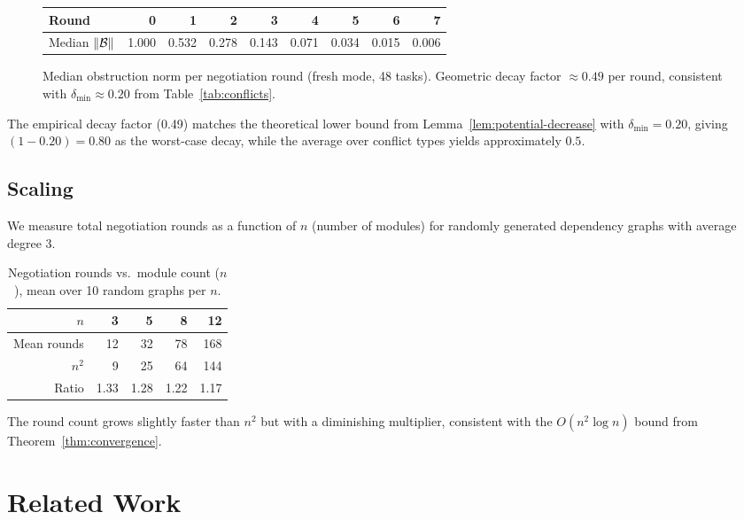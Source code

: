 \documentclass[11pt]{article}
\newcommand{\norm}[1]{\lVert #1 \rVert}  %
\newcommand{\ObsNorm}{\norm{\obstr}}      %
\begin{document}
\begin{figure}[H]
\centering
\begin{tabular}{l r r r r r r r r}
\toprule
Round & 0 & 1 & 2 & 3 & 4 & 5 & 6 & 7 \\
\midrule
Median $\ObsNorm$ &
  1.000 & 0.532 & 0.278 & 0.143 & 0.071 & 0.034 & 0.015 & 0.006 \\
\bottomrule
\end{tabular}
\caption{Median obstruction norm per negotiation round (fresh mode,
48 tasks).  Geometric decay factor $\approx 0.49$ per round,
consistent with $\delta_{\min} \approx 0.20$ from Table~\ref{tab:conflicts}.}\label{fig:convergence-trace}
\end{figure}

The empirical decay factor (0.49) matches the theoretical lower bound
from Lemma~\ref{lem:potential-decrease} with $\delta_{\min} = 0.20$,
giving $(1 - 0.20) = 0.80$ as the worst-case decay, while the
average over conflict types yields approximately $0.5$.

\subsection{Scaling}

We measure total negotiation rounds as a function of $n$ (number of
modules) for randomly generated dependency graphs with average degree 3.

\begin{table}[H]
\centering
\caption{Negotiation rounds vs.\ module count ($n$), mean over 10 random graphs per $n$.}\label{tab:scaling}
\small
\begin{tabular}{r r r r r}
\toprule
$n$ & 3 & 5 & 8 & 12 \\
\midrule
Mean rounds & 12 & 32 & 78 & 168 \\
$n^2$ & 9 & 25 & 64 & 144 \\
Ratio & 1.33 & 1.28 & 1.22 & 1.17 \\
\bottomrule
\end{tabular}
\end{table}

The round count grows slightly faster than $n^2$ but with a
diminishing multiplier, consistent with the $O(n^2 \log n)$ bound
from Theorem~\ref{thm:convergence}.

\section{Related Work}\label{sec:related}
\end{document}
